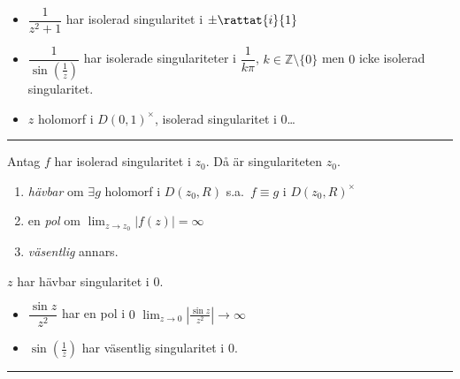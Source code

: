 \begin{example}
\begin{itemize}
  \item $\dfrac{1}{z^2 + 1}$  har isolerad singularitet i $\pm \rattat{i}{1}$
  \item $\dfrac{1}{\sin(\frac{1}{z})}$ har isolerade singulariteter i $\dfrac{1}{k\pi}$, $k \in \mathbb{Z} \setminus \{0\}$
  men $0$ icke isolerad singularitet.
  \item $z$ holomorf i $D(0, 1)^\times$, isolerad singularitet i $0$\dots
\end{itemize}
\end{example}

\noindent\rule{\linewidth}{0.4pt}

\begin{definition}
Antag $f$ har isolerad singularitet i $z_0$. Då är singulariteten $z_0$.
\begin{enumerate}[label=\textcolor{red!70!black}{\roman*)}]
  \item \emph{hävbar} om $\exists g$ holomorf i $D(z_0, R)$ s.a.\ $f \equiv g$ i $D(z_0, R)^\times$
  \item en \emph{pol} om $\displaystyle\lim_{z \to z_0} |f(z)| = \infty$
  \item \emph{väsentlig} annars.
\end{enumerate}
\end{definition}

\begin{example}
$z$ har hävbar singularitet i $0$.
\begin{itemize}
  \item $\dfrac{\sin z}{z^2}$ har en pol i $0$ \quad \textcolor{magenta!80!black}{$\displaystyle\lim_{z \to 0} \left| \frac{\sin z}{z^2} \right| \to \infty$}
  \item $\sin(\frac{1}{z})$ har väsentlig singularitet i $0$.
\end{itemize}
\end{example}

\noindent\rule{\linewidth}{0.4pt}

